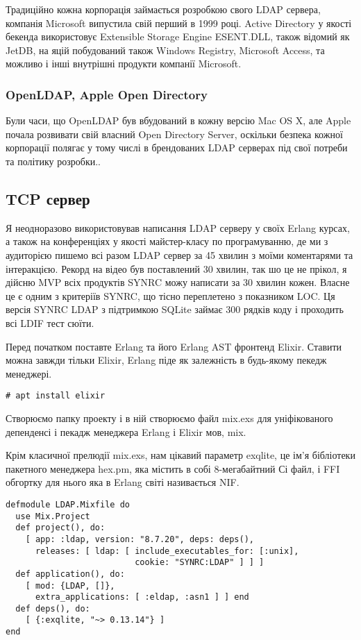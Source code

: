 Традиційно кожна корпорація займається розробкою свого LDAP сервера, компанія Microsoft випустила свій перший в 1999 році. Active Directory у якості бекенда використовує Extensible Storage Engine ESENT.DLL, також відомий як JetDB, на яцій побудований також Windows Registry, Microsoft Access, та можливо і інші внутрішні продукти компанії Microsoft.

\subsubsection{OpenLDAP, Apple Open Directory}

Були часи, що OpenLDAP був вбудований в кожну версію Mac OS X, але Apple почала розвивати свій власний Open Directory Server, оскільки безпека кожної корпорації полягає у тому числі в брендованих LDAP серверах під свої потреби та політику розробки..

\subsection{TCP сервер}

Я неодноразово використовував написання LDAP серверу у своїх Erlang курсах, а також на конференціях у якості майстер-класу по програмуванню, де ми з аудиторією пишемо всі разом LDAP сервер за 45 хвилин з моїми коментарями та інтеракцією. Рекорд на відео був поставлений 30 хвилин, так шо це не прікол, я дійсню MVP всіх продуктів SYNRC можу написати за 30 хвилин кожен. Власне це є одним з критеріїв SYNRC, що тісно переплетено з показником LOC. Ця версія SYNRC LDAP з підтримкою SQLite займає 300 рядків коду і проходить всі LDIF тест сюїти.

Перед початком поставте Erlang та його Erlang AST фронтенд Elixir. Ставити можна завжди тільки Elixir, Erlang піде як залежність в будь-якому пекедж менеджері.

\begin{lstlisting}
# apt install elixir
\end{lstlisting}

Створюємо папку проекту і в ній створюємо файл mix.exs для уніфікованого депенденсі і пекадж менеджера Erlang і Elixir мов, mix.

Крім класичної прелюдії mix.exs, нам цікавий параметр exqlite, це ім'я бібліотеки пакетного менеджера hex.pm, яка містить в собі 8-мегабайтний Сі файл, і FFI обгортку для нього яка в Erlang світі називається NIF.

\begin{lstlisting}
defmodule LDAP.Mixfile do
  use Mix.Project
  def project(), do:
    [ app: :ldap, version: "8.7.20", deps: deps(),
      releases: [ ldap: [ include_executables_for: [:unix],
                          cookie: "SYNRC:LDAP" ] ] ]
  def application(), do:
    [ mod: {LDAP, []},
      extra_applications: [ :eldap, :asn1 ] ] end
  def deps(), do:
    [ {:exqlite, "~> 0.13.14"} ]
end
\end{lstlisting}

